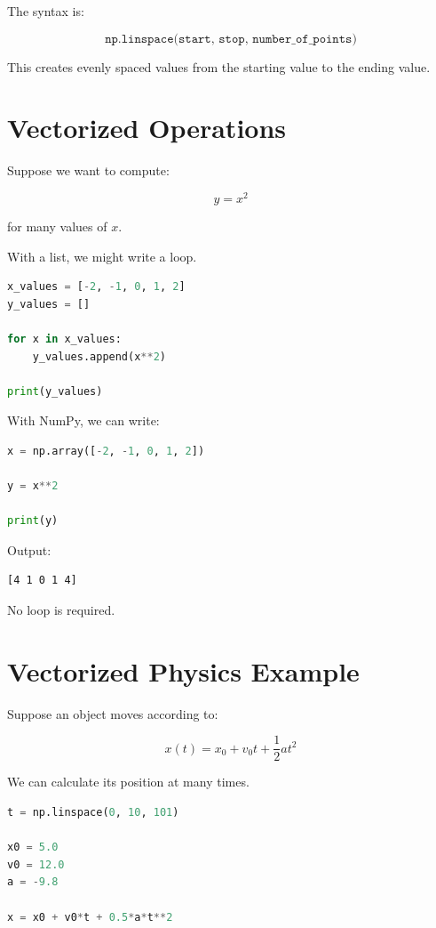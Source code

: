 \documentclass[11pt]{article}
\begin{document}
The syntax is:

\[
\texttt{np.linspace(start, stop, number\_of\_points)}
\]

This creates evenly spaced values from the starting value to the ending value.

\section{Vectorized Operations}

Suppose we want to compute:

\[
y = x^2
\]

for many values of \(x\).

With a list, we might write a loop.

\begin{lstlisting}[language=Python]
x_values = [-2, -1, 0, 1, 2]
y_values = []

for x in x_values:
    y_values.append(x**2)

print(y_values)
\end{lstlisting}

With NumPy, we can write:

\begin{lstlisting}[language=Python]
x = np.array([-2, -1, 0, 1, 2])

y = x**2

print(y)
\end{lstlisting}

Output:

\begin{verbatim}
[4 1 0 1 4]
\end{verbatim}

No loop is required.

\section{Vectorized Physics Example}

Suppose an object moves according to:

\[
x(t) = x_0 + v_0t + \frac{1}{2}at^2
\]

We can calculate its position at many times.

\begin{lstlisting}[language=Python]
t = np.linspace(0, 10, 101)

x0 = 5.0
v0 = 12.0
a = -9.8

x = x0 + v0*t + 0.5*a*t**2
\end{lstlisting}
\end{document}
